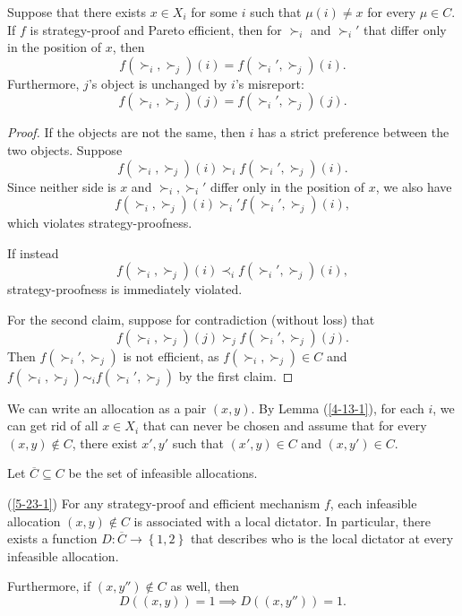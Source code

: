 \begin{lemma} \label{4-13-1}
	Suppose that there exists $x \in X_i$ for some $i$ such that $\mu(i) \ne x$ for every $\mu \in C$. 
	If $f$ is strategy-proof and Pareto efficient, then for $\succ_i$ and $\succ_i'$ that differ only in the position of $x$, then \[
		f(\succ_i, \succ_j)(i) = f\left( \succ_i', \succ_j \right)(i)
	.\] 
	Furthermore, $j$'s object is unchanged by $i$'s misreport: \[
		f\left( \succ_i,\succ_j \right)(j)
		= 
		f\left( \succ_i',\succ_j \right)(j)
	.\] 
\end{lemma}
\begin{proof}
	If the objects are not the same, then $i$ has a strict preference between the two objects. 
	Suppose \[
		f(\succ_i, \succ_j)(i) \succ_i f\left( \succ_i', \succ_j \right)(i)
	.\] Since neither side is $x$ and $\succ_i,\succ_i'$ differ only in the position of $x$, we also have \[
		f(\succ_i, \succ_j)(i) \succ_i' f\left( \succ_i', \succ_j \right)(i)
	,\] 
	which violates strategy-proofness.

	If instead \[
		f(\succ_i, \succ_j)(i) \prec_i f\left( \succ_i', \succ_j \right)(i)
	,\] 
	strategy-proofness is immediately violated.

	\medskip

	For the second claim, suppose for contradiction (without loss) that \[f\left( \succ_i, \succ_j \right)(j) \succ_j f\left( \succ_i',\succ_j \right)(j).\]
	Then $f(\succ_i', \succ_j)$ is not efficient, as $f(\succ_i, \succ_j) \in C$ and $f(\succ_i,\succ_j) \sim_i f\left( \succ_i', \succ_j \right)$ by the first claim.
\end{proof}

We can write an allocation as a pair $(x,y)$. By Lemma (\ref{4-13-1}), for each $i$, we can get rid of all $x \in X_i$ that can never be chosen and assume that for every $(x,y) \not\in C$, there exist $x', y'$ such that $(x',y) \in C$ and $\left( x,y' \right) \in C$.

Let $\overline{C} \subseteq C$ be the set of infeasible allocations.

\begin{lemma} (\ref{5-23-1})
	For any strategy-proof and efficient mechanism $f$, each infeasible allocation $\left( x,y \right) \not\in  C$ is associated with a local dictator. In particular, there exists a function $D: \overline{C} \to \left\{1,2\right\}$ that describes who is the local dictator at every infeasible allocation.

	Furthermore, if $(x,y'') \not\in C$ as well, then \[
		D\left( \left( x,y \right) \right) = 1 \implies D\left( \left( x,y'' \right) \right) = 1
	.\] 
\end{lemma}

